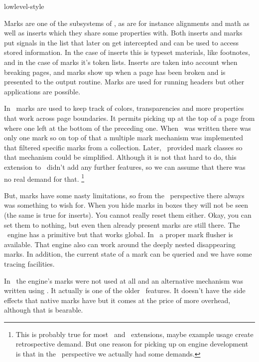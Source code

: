 
\environment lowlevel-style

\startdocument
  [title=marks,
   color=middlemagenta]

\startsectionlevel[title=Introduction]

Marks are one of the subsystems of \TEX, as are for instance alignments and math
as well as inserts which they share some properties with. Both inserts and marks
put signals in the list that later on get intercepted and can be used to access
stored information. In the case of inserts this is typeset materials, like
footnotes, and in the case of marks it's token lists. Inserts are taken into
account when breaking pages, and marks show up when a page has been broken and is
presented to the output routine. Marks are used for running headers but other
applications are possible.

In \MKII\ marks are used to keep track of colors, transparencies and more
properties that work across page boundaries. It permits picking up at the top of
a page from where one left at the bottom of the preceding one. When \MKII\ was
written there was only one mark so on top of that a multiple mark mechanism was
implemented that filtered specific marks from a collection. Later, \ETEX\
provided mark classes so that mechanism could be simplified. Although it is not
that hard to do, this extension to \TEX\ didn't add any further features, so we
can assume that there was no real demand for that. \footnote {This is probably
true for most \LUATEX\ and \LUAMETATEX\ extensions, maybe example usage create
retrospective demand. But one reason for picking up on engine development is that
in the \CONTEXT\ perspective we actually had some demands.}

But, marks have some nasty limitations, so from the \CONTEXT\ perspective there
always was something to wish for. When you hide marks in boxes they will not be
seen (the same is true for inserts). You cannot really reset them either. Okay,
you can set them to nothing, but even then already present marks are still there.
The \LUATEX\ engine has a \type {\clearmarks} primitive but that works global. In
\LUAMETATEX\ a proper mark flusher is available. That engine also can work around
the deeply nested disappearing marks. In addition, the current state of a mark
can be queried and we have some tracing facilities.

In \MKIV\ the engine's marks were not used at all and an alternative mechanism
was written using \LUA. It actually is one of the older \MKIV\ features. It
doesn't have the side effects that native marks have but it comes at the price of
more overhead, although that is bearable.

